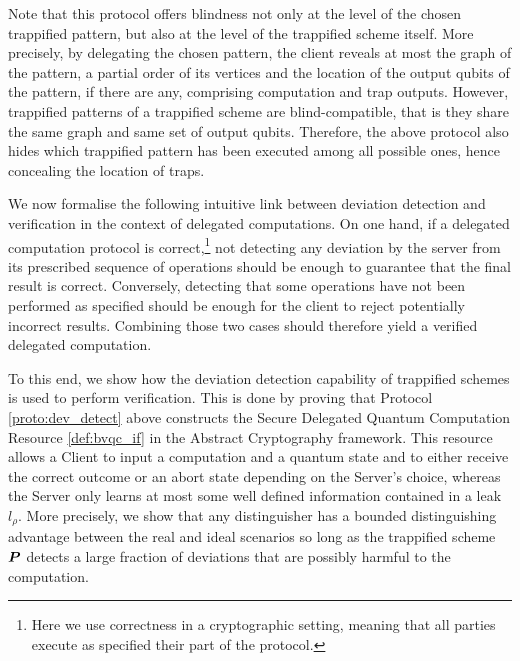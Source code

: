 \documentclass[12pt]{iopart}
\renewcommand{\1}{\mathds{1}}
\begin{document}
Note that this protocol offers blindness not only at the level of the chosen trappified pattern, but also at the level of the trappified scheme itself.
More precisely, by delegating the chosen pattern, the client reveals at most the graph of the pattern, a partial order of its vertices and the location of the output qubits of the pattern, if there are any, comprising computation and trap outputs.
However, trappified patterns of a trappified scheme are blind-compatible, that is they share the same graph and same set of output qubits.
Therefore, the above protocol also hides which trappified pattern has been executed among all possible ones, hence concealing the location of traps.

We now formalise the following intuitive link between deviation detection and verification in the context of delegated computations.
On one hand, if a delegated computation protocol is correct,\footnote{Here we use correctness in a cryptographic setting, meaning that all parties execute as specified their part of the protocol.} not detecting any deviation by the server from its prescribed sequence of operations should be enough to guarantee that the final result is correct.
Conversely, detecting that some operations have not been performed as specified should be enough for the client to reject potentially incorrect results.
Combining those two cases should therefore yield a verified delegated computation.

To this end, we show how the deviation detection capability of trappified schemes is used to perform verification.
This is done by proving that Protocol \ref{proto:dev_detect} above constructs the Secure Delegated Quantum Computation Resource \ref{def:bvqc_if} in the Abstract Cryptography framework. 
This resource allows a Client to input a computation and a quantum state and to either receive the correct outcome or an abort state depending on the Server's choice, whereas the Server only learns at most some well defined information contained in a leak $l_{\rho}$. 
More precisely, we show that any distinguisher has a bounded distinguishing advantage between the real and ideal scenarios so long as the trappified scheme $\bm{P}$ detects a large fraction of deviations that are possibly harmful to the computation.
\end{document}
